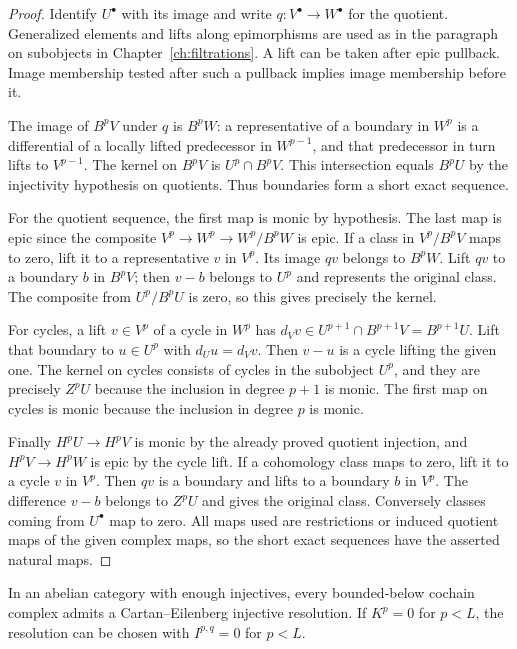 \begin{proof}
Identify \(U^\bullet\) with its image and write \(q:V^\bullet\to W^\bullet\)
for the quotient. Generalized elements and lifts along epimorphisms
are used as in the paragraph on subobjects in Chapter~\ref{ch:filtrations}.
A lift can be taken after epic pullback. Image membership tested after
such a pullback implies image membership before it.

The image of \(B^pV\) under \(q\) is \(B^pW\): a representative of
a boundary in \(W^p\) is a differential of a locally lifted
predecessor in \(W^{p-1}\), and that predecessor in turn lifts to
\(V^{p-1}\). The kernel on \(B^pV\) is \(U^p\cap B^pV\). This
intersection equals \(B^pU\) by the injectivity hypothesis on
quotients. Thus boundaries form a short exact sequence.

For the quotient sequence, the first map is monic by hypothesis.
The last map is epic since the composite \(V^p\to W^p\to W^p/B^pW\)
is epic. If a class in \(V^p/B^pV\) maps to zero, lift it to a
representative \(v\) in \(V^p\). Its image \(qv\) belongs to \(B^pW\).
Lift \(qv\) to a boundary \(b\) in \(B^pV\); then \(v-b\) belongs
to \(U^p\) and represents the original class. The composite from
\(U^p/B^pU\) is zero, so this gives precisely the kernel.

For cycles, a lift \(v\in V^p\) of a cycle in \(W^p\) has
\(d_Vv\in U^{p+1}\cap B^{p+1}V=B^{p+1}U\). Lift that boundary to
\(u\in U^p\) with \(d_Uu=d_Vv\). Then \(v-u\) is a cycle lifting
the given one. The kernel on cycles consists of cycles in the
subobject \(U^p\), and they are precisely \(Z^pU\) because the
inclusion in degree \(p+1\) is monic. The first map on cycles is
monic because the inclusion in degree \(p\) is monic.

Finally \(H^pU\to H^pV\) is monic by the already proved quotient
injection, and \(H^pV\to H^pW\) is epic by the cycle lift. If a
cohomology class maps to zero, lift it to a cycle \(v\) in \(V^p\).
Then \(qv\) is a boundary and lifts to a boundary \(b\) in \(V^p\).
The difference \(v-b\) belongs to \(Z^pU\) and gives the original
class. Conversely classes coming from \(U^\bullet\) map to zero.
All maps used are restrictions or induced quotient maps of the
given complex maps, so the short exact sequences have the asserted
natural maps.
\end{proof}

\begin{theorem}
\label{res:G01}
In an abelian category with enough injectives, every bounded-below
cochain complex admits a Cartan--Eilenberg injective resolution.
If \(K^p=0\) for \(p<L\), the resolution can be chosen with
\(I^{p,q}=0\) for \(p<L\).
\end{theorem}

